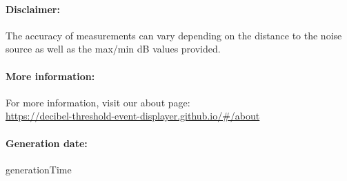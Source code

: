 \documentclass{article}
\begin{document}
\paragraph{Disclaimer:}\mbox{}\newline
The accuracy of measurements can vary depending on the distance to the noise source as well as the max/min dB values provided.

\paragraph{More information:}\mbox{}\newline
For more information, visit our about page: \\
\url{https://decibel-threshold-event-displayer.github.io/#/about}

\paragraph{Generation date:} {{generationTime}}
\end{document}

